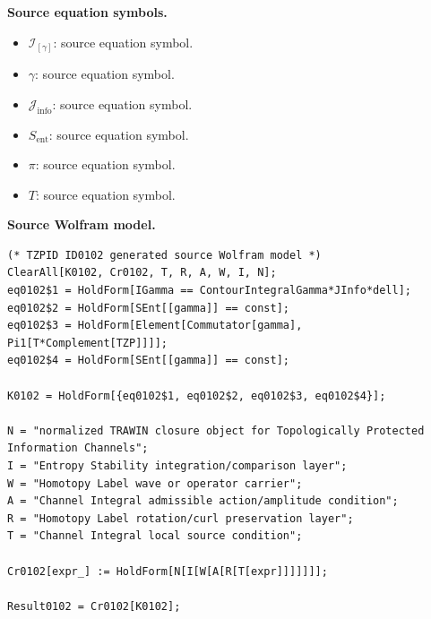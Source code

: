 \begin{minipage}[t]{0.49\linewidth}
\begingroup
\small
\raggedright
\textbf{Source equation symbols.}\par
\begin{itemize}[leftmargin=1.35em,itemsep=1pt,topsep=1pt,parsep=0pt]
    \item $\mathcal{I}_{[\gamma]}$: source equation symbol.
    \item $\gamma$: source equation symbol.
    \item $\mathcal{J}_{\mathrm{info}}$: source equation symbol.
    \item $S_{\mathrm{ent}}$: source equation symbol.
    \item $\pi$: source equation symbol.
    \item $T$: source equation symbol.
\end{itemize}
\endgroup
\end{minipage}\hfill
\begin{minipage}[t]{0.47\linewidth}
\begingroup
\scriptsize
\raggedright
\textbf{Source Wolfram model.}\par
\begin{Verbatim}[fontsize=\tiny,breaklines=true,breakanywhere=true]
(* TZPID ID0102 generated source Wolfram model *)
ClearAll[K0102, Cr0102, T, R, A, W, I, N];
eq0102$1 = HoldForm[IGamma == ContourIntegralGamma*JInfo*dell];
eq0102$2 = HoldForm[SEnt[[gamma]] == const];
eq0102$3 = HoldForm[Element[Commutator[gamma], Pi1[T*Complement[TZP]]]];
eq0102$4 = HoldForm[SEnt[[gamma]] == const];

K0102 = HoldForm[{eq0102$1, eq0102$2, eq0102$3, eq0102$4}];

N = "normalized TRAWIN closure object for Topologically Protected Information Channels";
I = "Entropy Stability integration/comparison layer";
W = "Homotopy Label wave or operator carrier";
A = "Channel Integral admissible action/amplitude condition";
R = "Homotopy Label rotation/curl preservation layer";
T = "Channel Integral local source condition";

Cr0102[expr_] := HoldForm[N[I[W[A[R[T[expr]]]]]]];

Result0102 = Cr0102[K0102];
\end{Verbatim}
\endgroup
\end{minipage}

